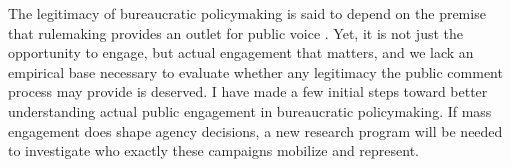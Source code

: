 

The legitimacy of bureaucratic policymaking is said to depend on the premise that rulemaking provides an outlet for public voice \citep{Croley2003, Rosenbloom2003}. Yet, it is not just the opportunity to engage, but actual engagement that matters, and we lack an empirical base necessary to evaluate whether any legitimacy the public comment process may provide is deserved. I have made a few initial steps toward better understanding actual public engagement in bureaucratic policymaking.
If mass engagement does shape agency decisions, a new research program will be needed to investigate who exactly these campaigns mobilize and represent.

